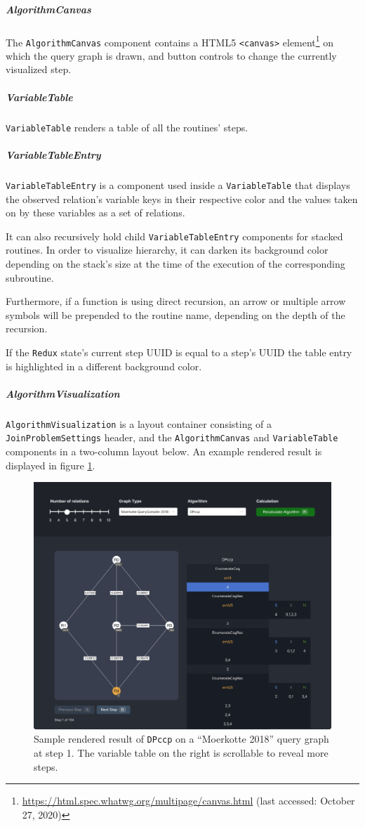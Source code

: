 \subparagraph{AlgorithmCanvas}
The \texttt{AlgorithmCanvas} component contains a HTML5 \texttt{<canvas>} element\footnote{\url{https://html.spec.whatwg.org/multipage/canvas.html} (last accessed: October 27, 2020)} on which the query graph is drawn, and button controls to change the currently visualized step. 

\subparagraph{VariableTable}
\texttt{VariableTable} renders a table of all the routines' steps.

\subparagraph{VariableTableEntry}
\texttt{VariableTableEntry} is a component used inside a \texttt{VariableTable} that displays the observed relation's variable keys in their respective color and the values taken on by these variables as a set of relations.

It can also recursively hold child \texttt{VariableTableEntry} components for stacked routines. 
In order to visualize hierarchy, it can darken its background color depending on the stack's size at the time of the execution of the corresponding subroutine.

Furthermore, if a function is using direct recursion, an arrow or multiple arrow symbols will be prepended to the routine name, depending on the depth of the recursion.

If the \texttt{Redux} state's current step UUID is equal to a step's UUID the table entry is highlighted in a different background color.

\subparagraph{AlgorithmVisualization} 
\texttt{AlgorithmVisualization} is a layout container consisting of a \texttt{JoinProblemSettings} header, and the \texttt{AlgorithmCanvas} and \texttt{VariableTable} components in a two-column layout below. An example rendered result is displayed in figure \ref{fig:sample-rendered-dpccp}.

\begin{figure}[H]
    \includegraphics[width=\textwidth + 2cm]{img/renderedVisualization.png}
    \caption[Sample rendered result of \texttt{DPccp} on a ``Moerkotte 2018'' query graph at step 1]{Sample rendered result of \texttt{DPccp} on a ``Moerkotte 2018'' query graph at step 1. The variable table on the right is scrollable to reveal more steps.}
    \label{fig:sample-rendered-dpccp}
\end{figure}

